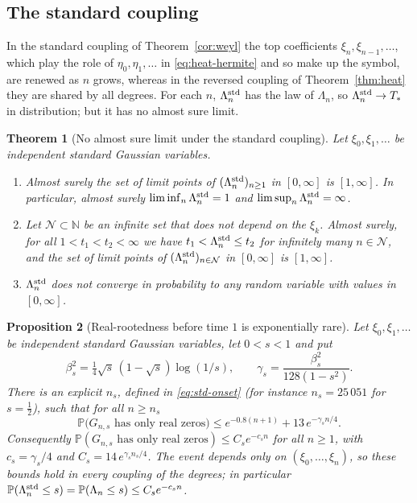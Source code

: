 \documentclass[11pt]{amsart}
\newtheorem{theorem}{Theorem}[section]
\newtheorem{proposition}[theorem]{Proposition}
\theoremstyle{definition}
\theoremstyle{remark}
\numberwithin{equation}{section}
\newcommand{\N}{\mathbb{N}}
\newcommand{\PP}{\mathbb{P}}
\begin{document}
\subsection{The standard coupling}\label{sec:intro-standard}
In the standard coupling of Theorem~\ref{cor:weyl} the top coefficients $\xi_n,\xi_{n-1},\dots$, which play the role of $\eta_0,\eta_1,\dots$ in \eqref{eq:heat-hermite} and so make up the symbol, are renewed as $n$ grows, whereas in the reversed coupling of Theorem~\ref{thm:heat} they are shared by all degrees. For each $n$, $\Lambda_n^{\rm std}$ has the law of $\Lambda_n$, so $\Lambda_n^{\rm std}\to T_*$ in distribution; but it has no almost sure limit.

\begin{theorem}[No almost sure limit under the standard coupling]\label{thm:std}
Let $\xi_0,\xi_1,\dots$ be independent standard Gaussian variables.
\begin{enumerate}
\item[(a)] Almost surely the set of limit points of $(\Lambda_n^{\rm std})_{n\ge1}$ in $[0,\infty]$ is $[1,\infty]$. In particular, almost surely $\liminf_n\Lambda_n^{\rm std}=1$ and $\limsup_n\Lambda_n^{\rm std}=\infty$.
\item[(b)] Let $\mathcal N\subset\N$ be an infinite set that does not depend on the $\xi_k$. Almost surely, for all $1<t_1<t_2<\infty$ we have $t_1<\Lambda_n^{\rm std}\le t_2$ for infinitely many $n\in\mathcal N$, and the set of limit points of $(\Lambda_n^{\rm std})_{n\in\mathcal N}$ in $[0,\infty]$ is $[1,\infty]$.
\item[(c)] $\Lambda_n^{\rm std}$ does not converge in probability to any random variable with values in $[0,\infty]$.
\end{enumerate}
\end{theorem}

\begin{proposition}[Real-rootedness before time $1$ is exponentially rare]\label{prop:early}
Let $\xi_0,\xi_1,\dots$ be independent standard Gaussian variables, let $0<s<1$ and put
\[
\beta_s^2=\tfrac14\sqrt s\,(1-\sqrt s)\log(1/s),\qquad\gamma_s=\frac{\beta_s^2}{128(1-s^2)}.
\]
There is an explicit $n_s$, defined in \eqref{eq:std-onset} (for instance $n_s=25\,051$ for $s=\frac12$), such that for all $n\ge n_s$
\begin{equation}\label{eq:std-early}
\PP\bigl(G_{n,s}\text{ has only real zeros}\bigr)\le e^{-0.8(n+1)}+13\,e^{-\gamma_sn/4}.
\end{equation}
Consequently $\PP(G_{n,s}\text{ has only real zeros})\le C_se^{-c_sn}$ for all $n\ge1$, with $c_s=\gamma_s/4$ and $C_s=14\,e^{\gamma_sn_s/4}$. The event depends only on $(\xi_0,\dots,\xi_n)$, so these bounds hold in every coupling of the degrees; in particular $\PP(\Lambda_n^{\rm std}\le s)=\PP(\Lambda_n\le s)\le C_se^{-c_sn}$.
\end{proposition}
\end{document}
